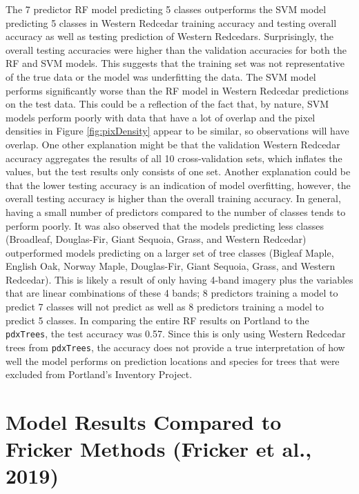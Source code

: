 \documentclass[12pt,twoside]{reedthesis}
\begin{document}
The 7 predictor RF model predicting 5 classes outperforms the SVM model predicting 5 classes in Western Redcedar training accuracy and testing overall accuracy as well as testing prediction of Western Redcedars. Surprisingly, the overall testing accuracies were higher than the validation accuracies for both the RF and SVM models. This suggests that the training set was not representative of the true data or the model was underfitting the data. The SVM model performs significantly worse than the RF model in Western Redcedar predictions on the test data. This could be a reflection of the fact that, by nature, SVM models perform poorly with data that have a lot of overlap and the pixel densities in Figure \ref{fig:pixDensity} appear to be similar, so observations will have overlap. One other explanation might be that the validation Western Redcedar accuracy aggregates the results of all 10 cross-validation sets, which inflates the values, but the test results only consists of one set. Another explanation could be that the lower testing accuracy is an indication of model overfitting, however, the overall testing accuracy is higher than the overall training accuracy. In general, having a small number of predictors compared to the number of classes tends to perform poorly. It was also observed that the models predicting less classes (Broadleaf, Douglas-Fir, Giant Sequoia, Grass, and Western Redcedar) outperformed models predicting on a larger set of tree classes (Bigleaf Maple, English Oak, Norway Maple, Douglas-Fir, Giant Sequoia, Grass, and Western Redcedar). This is likely a result of only having 4-band imagery plus the variables that are linear combinations of these 4 bands; 8 predictors training a model to predict 7 classes will not predict as well as 8 predictors training a model to predict 5 classes. In comparing the entire RF results on Portland to the \texttt{pdxTrees}, the test accuracy was 0.57. Since this is only using Western Redcedar trees from \texttt{pdxTrees}, the accuracy does not provide a true interpretation of how well the model performs on prediction locations and species for trees that were excluded from Portland's Inventory Project.

\hypertarget{model-results-compared-to-fricker-methods-fricker_convolutional_2019}{%
\section{Model Results Compared to Fricker Methods (Fricker et al., 2019)}\label{model-results-compared-to-fricker-methods-fricker_convolutional_2019}}
\end{document}
